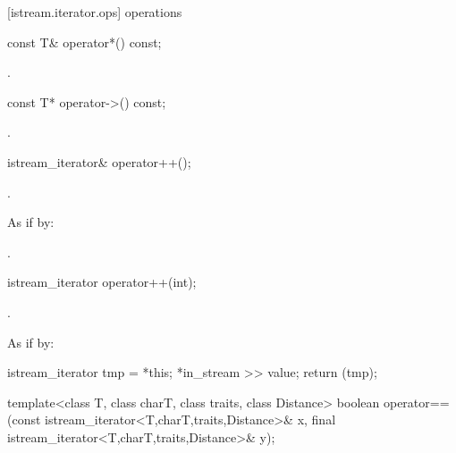 [istream.iterator.ops]{ operations}

%
\begin{itemdecl}
const T& operator*() const;
\end{itemdecl}

\begin{itemdescr}
\pnum
\returns
{}.
\end{itemdescr}

%
\begin{itemdecl}
const T* operator->() const;
\end{itemdecl}

\begin{itemdescr}
\pnum
\returns
{}.
\end{itemdescr}

%
\begin{itemdecl}
istream_iterator& operator++();
\end{itemdecl}

\begin{itemdescr}
\pnum
\requires {}.

\pnum
\effects
As if by: 

\pnum
\returns
{}.
\end{itemdescr}

%
\begin{itemdecl}
istream_iterator operator++(int);
\end{itemdecl}

\begin{itemdescr}
\pnum
\requires {}.

\pnum
\effects
As if by:
\begin{codeblock}
istream_iterator tmp = *this;
*in_stream >> value;
return (tmp);
\end{codeblock}
\end{itemdescr}

%
\begin{itemdecl}
template<class T, class charT, class traits, class Distance>
  boolean operator==(const istream_iterator<T,charT,traits,Distance>& x,
                  final istream_iterator<T,charT,traits,Distance>& y);
\end{itemdecl}

